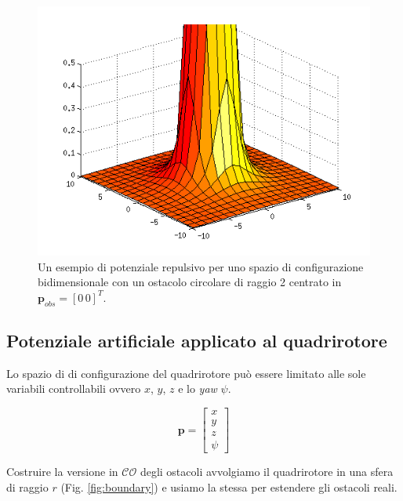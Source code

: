 \documentclass[a4paper,10pt]{article}
\begin{document}
\begin{figure}
\begin{center}
\includegraphics[scale=0.5]{img/repulsive.png}
\caption{Un esempio di potenziale repulsivo per uno spazio di configurazione bidimensionale con un ostacolo circolare di raggio 2 centrato in $\mathbf{p}_{obs} = [0 \, 0]^T$. }
\end{center}
\end{figure}

\subsection{Potenziale artificiale applicato al quadrirotore}

Lo spazio di di configurazione del quadrirotore può essere limitato alle sole variabili controllabili ovvero $x$, $y$, $z$ e lo \emph{yaw} $\psi$. 

\begin{equation}
\mathbf{p} = \left[ 
\begin{matrix}
x \\ y \\ z \\ \psi 
\end{matrix}
\right]
\end{equation}

Costruire la versione in $\mathcal{CO}$ degli ostacoli avvolgiamo il quadrirotore in una sfera di raggio $r$ (Fig. \ref{fig:boundary}) e usiamo la stessa per estendere gli ostacoli reali.
\end{document}
